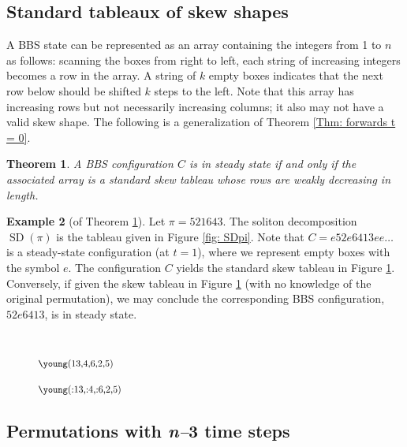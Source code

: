 \documentclass[submission]{FPSAC2021}
\theoremstyle{plain}
\newtheorem{theorem}{Theorem}[section]
\theoremstyle{definition}
\newtheorem{example}[theorem]{Example}
\numberwithin{equation}{section}
\DeclareMathOperator{\SDself}{SD}
\newcommand{\SD}[1]{\SDself(#1)}
\begin{document}
\subsection{Standard tableaux of skew shapes}
\label{sec: skew}
A BBS state can be represented as an array containing the integers from 1 to $n$ as follows: scanning the boxes from right to left, each string of increasing integers becomes a row in the array. 
A string of $k$ empty boxes indicates that the next row below should be shifted $k$ steps to the left.
Note that this array has increasing rows but not necessarily increasing columns; it also may not have a valid skew shape. The following is a generalization of Theorem \ref{Thm: forwards t = 0}.
\begin{theorem}\label{thm: t=0 generalization} A BBS configuration $C$ is in steady state if and only if the associated array is a standard skew tableau whose rows are weakly decreasing in length. \end{theorem}
\begin{example}[of Theorem \ref{thm: t=0 generalization}]
Let $\pi = 521643$. The soliton decomposition $\SD{\pi}$ is the tableau given in Figure \ref{fig: SDpi}. Note that $C=e52e6413ee\dots$ is a steady-state configuration (at $t=1$), where we represent empty boxes with the symbol $e$.
The configuration $C$
yields the standard skew tableau in Figure \ref{fig:resultantSkew}.
Conversely, if given the skew tableau in Figure \ref{fig:resultantSkew}
(with no knowledge of the original permutation), we may conclude the corresponding BBS configuration, $52e6413$, is in steady state.

\begin{figure}[H]
\centering
\begin{minipage}{.4\textwidth}
  \centering
    $\raisebox{-2em}{\scalebox{.85}{\young(13,4,6,2,5)}}$
  \captionof{figure}{$\SD{\pi}$}
  \label{fig: SDpi}
\end{minipage}%
\begin{minipage}{.6\textwidth}
  \centering
  $\scalebox{.85}{\young(:13,:4,:6,2,5)}$
  \label{fig:resultantSkew}
\end{minipage}
\end{figure}
\end{example}
\subsection{Permutations with \textit{n--}3 time steps} 
\end{document}
